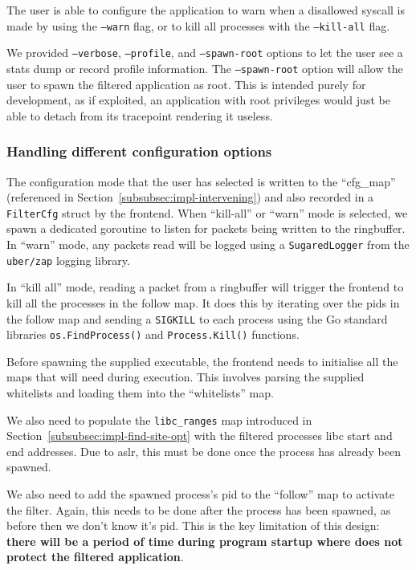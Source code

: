 The user is able to configure the application to warn when a disallowed syscall
is made by using the \texttt{--warn} flag, or to kill all processes with the
\texttt{--kill-all} flag. 

We provided \texttt{--verbose}, \texttt{--profile}, and \texttt{--spawn-root}
options to let the user see a stats dump or record profile information. The
\texttt{--spawn-root} option will allow the user to spawn the filtered
application as root. This is intended purely for development, as if exploited,
an application with root privileges would just be able to detach \af from its
tracepoint rendering it useless.


\subsubsection{Handling different configuration options}

The configuration mode that the user has selected is written to the
``cfg\_map'' (referenced in Section~\ref{subsubsec:impl-intervening}) and also
recorded in a \texttt{FilterCfg} struct by the frontend. When ``kill-all'' or
``warn'' mode is selected, we spawn a dedicated goroutine to listen for packets
being written to the ringbuffer. In ``warn'' mode, any packets read will be
logged using a \texttt{SugaredLogger} from the \texttt{uber/zap} logging
library. 

In ``kill all'' mode, reading a packet from a ringbuffer will trigger
the frontend to kill all the processes in the follow map. It does this by
iterating over the \acp{pid} in the follow map and sending a \texttt{SIGKILL} to
each process using the Go standard libraries \texttt{os.FindProcess()} and
\texttt{Process.Kill()} functions.

Before spawning the supplied executable, the frontend needs to initialise all
the maps that \af will need during execution. This involves parsing the
supplied whitelists and loading them into the ``whitelists'' map. 

We also need to populate the \texttt{libc\_ranges} map introduced in
Section~\ref{subsubsec:impl-find-site-opt} with the filtered processes \ac{libc}
start and end addresses. Due to \ac{aslr}, this must be done once the process
has already been spawned. 

We also need to add the spawned process's \ac{pid} to the ``follow'' map to
activate the filter. Again, this needs to be done after the process has been
spawned, as before then we don't know it's \ac{pid}. This is the key limitation of 
this design: \textbf{there will be a period of time during program startup where \af 
does not protect the filtered application}.

